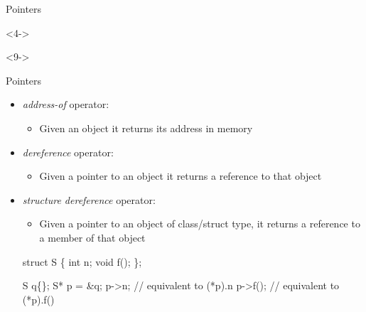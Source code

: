 \begin{frame}[fragile]{Pointers}
\begin{tikzpicture}
  \end{tikzpicture}

  \begin{codeblock}<4->{
}\end{codeblock}

  \begin{codeblock}<9->{
}\end{codeblock}


\end{frame}

\begin{frame}[fragile]{Pointers \insertcontinuationtext}

  \begin{itemize}
  \item<1-> \textit{address-of} operator: \alert{\code{\&}}
    \begin{itemize}
    \item Given an object it returns its address in memory
    \end{itemize}
  \item<2-> \textit{dereference} operator: \alert{\code{*}}
    \begin{itemize}
    \item Given a pointer to an object it returns a reference to that object
    \end{itemize}
  \item<3-> \textit{structure dereference} operator: \alert{\code{->}}
    \begin{itemize}
    \item Given a pointer to an object of class/struct type, it returns a
      reference to a member of that object
    \end{itemize}
    \begin{codeblock}
struct S \{
  int n;
  void f();
\};

S q\{\ddd\};
S* p = &q;
p->n;        // equivalent to (*p).n
p->f();      // equivalent to (*p).f()\end{codeblock}

  \end{itemize}
\end{frame}


